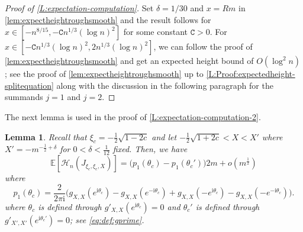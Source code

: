 \documentclass[11pt,twoside]{amsart}
\theoremstyle{plain}
\newtheorem{lem}[thm]{Lemma}
\numberwithin{quest}{section}
\theoremstyle{remark}
\numberwithin{rem}{section}
\theoremstyle{definition}
\begin{document}
	
	
	\begin{proof}[Proof of \cref{L:expectation-computation}]
		Set $\delta=1/30$ and $x=Rm$ in \cref{lem:expectheightroughsmooth} and the result follows for $x\in [-n^{8/15},- \mathtt{C}n^{1/3} (\log n)^2]$ for some constant $\mathtt{C}>0$. For $x \in [-\mathtt{C}n^{1/3}(\log n)^2,2n^{1/3}(\log n)^2]$, we can follow the proof of \cref{lem:expectheightroughsmooth} and get an expected height bound of $O(\log^2 n)$; see the proof of \cref{lem:expectheightroughsmooth} up to \eqref{L:Proof:expectedheight-splitequation} along with the discussion in the following paragraph for the summands $j=1$ and $j=2$.  
	\end{proof}
	
	The next lemma is used in the proof of \cref{L:expectation-computation-2}.  
	\begin{lem}\label{lem:expectheightrough}
		Recall that $\xi_c=-\frac{1}{2}\sqrt{1-2c}$ and let $-\frac{1}{2}\sqrt{1+2c}<X<X'$ where $X'=- m^{-\frac{1}{2}+\delta}$ for $0<\delta<\frac{1}{12}$ fixed. 
		Then, we have
		\begin{equation*}
			\mathbb{E}[\mathcal{H}_n(J_{\xi_c,\xi_c,X})]= \big(p_1(\theta_c)-p_1(\theta_c')\big)2m+o(m^{\frac{1}{2}})
		\end{equation*}
		where 
		\begin{equation*}
			p_1(\theta_c)=\frac{2}{2\pi \mathrm{i}} \big(g_{X,X}(e^{\mathrm{i}\theta_c})-g_{X,X}(e^{-\mathrm{i}\theta_c})+g_{X,X}(-e^{\mathrm{i}\theta_c})-g_{X,X}(-e^{-\mathrm{i}\theta_c}) \big).
		\end{equation*}
		where $ \theta_c$ is defined through $g'_{X,X}(e^{\mathrm{i}\theta_c})=0$ and $ \theta_c'$ is defined through $g'_{X',X'}(e^{\mathrm{i}\theta_c'})=0$; see \eqref{eq:def:gprime}. 
		
	\end{lem}
	
\end{document}
